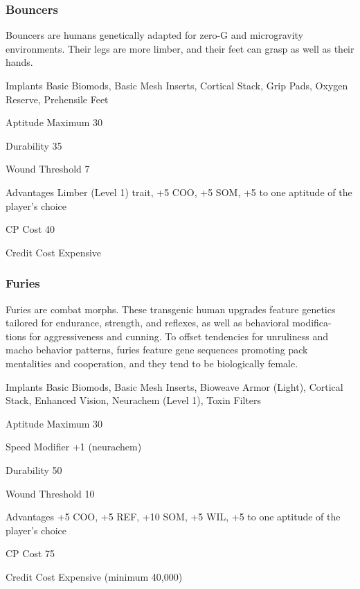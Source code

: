 \subsubsection{Bouncers}
\label{sec:starting-bouncers}

Bouncers are humans genetically adapted for zero-G and microgravity environments. Their legs are more limber, and their feet can grasp as well as their hands.

\begin{description*}
\item[Implants] Basic Biomods, Basic Mesh Inserts, Cortical Stack, Grip Pads, Oxygen Reserve, Prehensile Feet
\item[Aptitude Maximum] 30 
\item[Durability] 35 
\item[Wound Threshold] 7 
\item[Advantages] Limber (Level 1) trait, +5 COO, +5 SOM, +5 to one aptitude of the player’s choice
\item[CP Cost] 40 
\item[Credit Cost] Expensive 
\end{description*}

\subsubsection{Furies}
\label{sec:starting-furies}

Furies are combat morphs. These transgenic human upgrades feature genetics tailored for endurance, strength, and reflexes, as well as behavioral modifica- tions for aggressiveness and cunning. To offset tendencies for unruliness and macho behavior patterns, furies feature gene sequences promoting pack mentalities and cooperation, and they tend to be biologically female.

\begin{description*}
\item[Implants] Basic Biomods, Basic Mesh Inserts, Bioweave Armor (Light), Cortical Stack, Enhanced Vision, Neurachem (Level 1), Toxin Filters
\item[Aptitude Maximum] 30 
\item[Speed Modifier] +1 (neurachem) 
\item[Durability] 50 
\item[Wound Threshold] 10 
\item[Advantages] +5 COO, +5 REF, +10 SOM, +5 WIL, +5 to one aptitude of the player’s choice
\item[CP Cost] 75 
\item[Credit Cost] Expensive (minimum 40,000) 
\end{description*}

